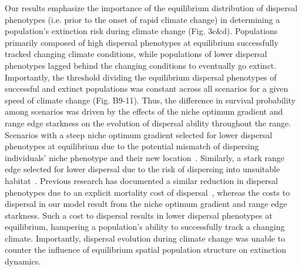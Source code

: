 \documentclass[11pt]{article}
\begin{document}
Our results emphasize the importance of the equilibrium distribution of dispersal phenotypes (i.e. prior to the onset of rapid climate change) in determining a population's extinction risk during climate change (Fig. 3c\&d). Populations primarily composed of high dispersal phenotypes at equilibrium successfully tracked changing climate conditions, while populations of lower dispersal phenotypes lagged behind the changing conditions to eventually go extinct. Importantly, the threshold dividing the equilibrium dispersal phenotypes of successful and extinct populations was constant across all scenarios for a given speed of climate change (Fig. B9-11). Thus, the difference in survival probability among scenarios was driven by the effects of the niche optimum gradient and range edge starkness on the evolution of dispersal ability throughout the range. Scenarios with a steep niche optimum gradient selected for lower dispersal phenotypes at equilibrium due to the potential mismatch of dispersing individuals' niche phenotype and their new location~\citep{kirkpatrick1997evolution}. Similarly, a stark range edge selected for lower dispersal due to the risk of dispersing into unsuitable habitat~\citep{shaw2014population, shaw2019evolution}. Previous research has documented a similar reduction in dispersal phenotypes due to an explicit mortality cost of dispersal~\citep{kubisch2013predicting}, whereas the costs to dispersal in our model result from the niche optimum gradient and range edge starkness. Such a cost to dispersal results in lower dispersal phenotypes at equilibrium, hampering a population's ability to successfully track a changing climate. Importantly, dispersal evolution during climate change was unable to counter the influence of equilibrium spatial population structure on extinction dynamics.
\end{document}
